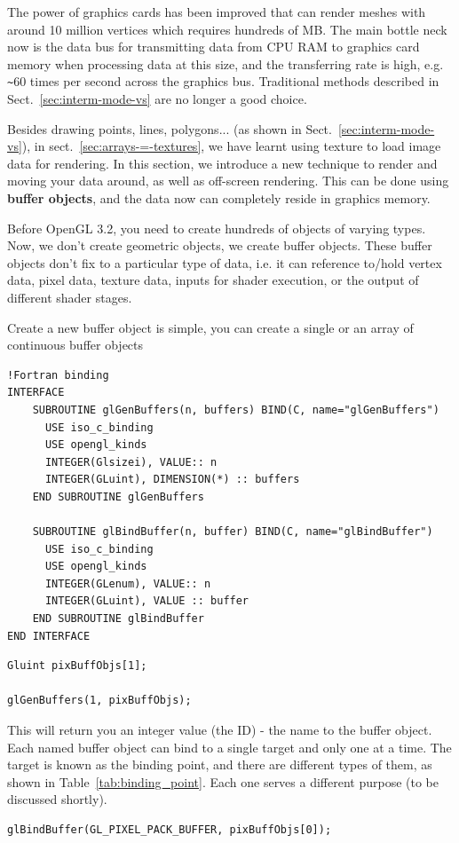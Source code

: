 The power of graphics cards has been improved that can render meshes
with around 10 million vertices which requires hundreds of MB. The
main bottle neck now is the data bus for transmitting data from CPU
RAM to graphics card memory when processing data at this size, and the
transferring rate is high, e.g.  \verb!~!60 times per second across
the graphics bus. Traditional methods described in
Sect.~\ref{sec:interm-mode-vs} are no longer a good choice.


Besides drawing points, lines, polygons... (as shown in
Sect.~\ref{sec:interm-mode-vs}), in sect.~\ref{sec:arrays-=-textures},
we have learnt using texture to load image data for rendering. In this
section, we introduce a new technique to render and moving your data
around, as well as off-screen rendering. This can be done using
{\bf buffer objects}, and the data now can completely reside in
graphics memory.

Before OpenGL 3.2, you need to create hundreds of objects of varying
types. Now, we don't create geometric objects, we create buffer
objects. These buffer objects don't fix to a particular type of data,
i.e. it can reference to/hold vertex data, pixel data, texture data,
inputs for shader execution, or the output of different shader stages.

Create a new buffer object is simple, you can create a single or an
array of continuous buffer objects
\begin{verbatim}
!Fortran binding
INTERFACE
    SUBROUTINE glGenBuffers(n, buffers) BIND(C, name="glGenBuffers")
      USE iso_c_binding
      USE opengl_kinds
      INTEGER(Glsizei), VALUE:: n
      INTEGER(GLuint), DIMENSION(*) :: buffers
    END SUBROUTINE glGenBuffers

    SUBROUTINE glBindBuffer(n, buffer) BIND(C, name="glBindBuffer")
      USE iso_c_binding
      USE opengl_kinds
      INTEGER(GLenum), VALUE:: n
      INTEGER(GLuint), VALUE :: buffer
    END SUBROUTINE glBindBuffer
END INTERFACE
\end{verbatim}

\begin{verbatim}
Gluint pixBuffObjs[1];

glGenBuffers(1, pixBuffObjs);
\end{verbatim}
This will return you an integer value (the ID) - the name to the
buffer object. Each named buffer object can bind to a single target
and only one at a time. The target is known as the binding point, and
there are different types of them, as shown in
Table~\ref{tab:binding_point}. Each one serves a different purpose (to
be discussed shortly). 
\begin{verbatim}
glBindBuffer(GL_PIXEL_PACK_BUFFER, pixBuffObjs[0]);
\end{verbatim}

